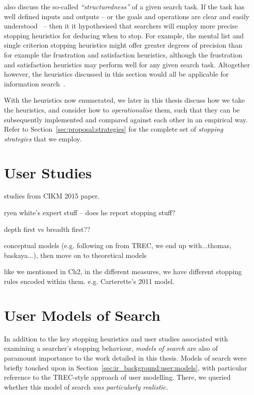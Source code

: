 \cite{browne2005stopping_rules} also discuss the so-called \emph{``structuredness''} of a given search task. If the task has well defined inputs and outputs -- or the goals and operations are clear and easily understood~\citep{simon1996sciences} -- then it it hypothesised that searchers will employ more precise stopping heuristics for deducing when to stop. For example, the mental list and single criterion stopping heuristics might offer greater degrees of precision than for example the frustration and satisfaction heuristics, although the frustration and satisfaction heuristics may perform well for any given search task. Altogether however, the heuristics discussed in this section would all be applicable for information search~\citep{browne2005stopping_rules}.

With the heuristics now enumerated, we later in this thesis discuss how we take the heuristics, and consider how to \emph{operationalise} them, such that they can be subsequently implemented and compared against each other in an empirical way. Refer to Section~\ref{sec:proposal:strategies} for the complete set of \emph{stopping strategies} that we employ.

\section{User Studies}

studies from CIKM 2015 paper.

ryen white's expert stuff -- does he report stopping stuff?

depth first vs breadth first??

conceptual models (e.g. following on from TREC, we end up with...thomas, baskaya...), then move on to theoretical models

like we mentioned in Ch2, in the different measures, we have different stopping rules encoded within them.
e.g. Carterette's 2011 model.


\section{User Models of Search}
In addition to the key stopping heuristics and user studies associated with examining a searcher's stopping behaviour, \emph{models of search} are also of paramount importance to the work detailed in this thesis. Models of search were briefly touched upon in Section~\ref{sec:ir_background:user:models}, with particular reference to the TREC-style approach of user modelling. There, we queried whether this model of search \emph{was particularly realistic.}

